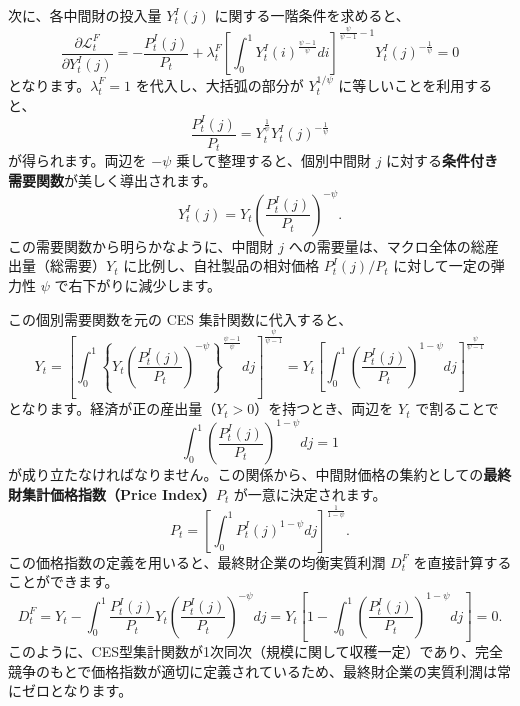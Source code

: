 \documentclass[
  japanese,
  lualatex,
  ja=standard,
  12pt,
  a4paper]{ltjsarticle}
\begin{document}
次に、各中間財の投入量 \(Y_t^I(j)\) に関する一階条件を求めると、 \[
\frac{\partial \mathcal{L}_t^F}{\partial Y_t^I(j)} = -\frac{P_t^I(j)}{P_t} + \lambda_t^F \left[ \int_0^1 Y_t^I(i)^{\frac{\psi-1}{\psi}} di \right]^{\frac{\psi}{\psi-1} - 1} Y_t^I(j)^{-\frac{1}{\psi}} = 0
\] となります。\(\lambda_t^F = 1\) を代入し、大括弧の部分が
\(Y_t^{1/\psi}\) に等しいことを利用すると、 \[
\frac{P_t^I(j)}{P_t} = Y_t^{\frac{1}{\psi}} Y_t^I(j)^{-\frac{1}{\psi}}
\] が得られます。両辺を \(-\psi\) 乗して整理すると、個別中間財 \(j\)
に対する\textbf{条件付き需要関数}が美しく導出されます。 \[
Y_t^I(j) = Y_t \left( \frac{P_t^I(j)}{P_t} \right)^{-\psi}.
\] この需要関数から明らかなように、中間財 \(j\)
への需要量は、マクロ全体の総産出量（総需要）\(Y_t\)
に比例し、自社製品の相対価格 \(P_t^I(j)/P_t\) に対して一定の弾力性
\(\psi\) で右下がりに減少します。

この個別需要関数を元の CES 集計関数に代入すると、 \[
Y_t = \left[ \int_0^1 \left\{ Y_t \left( \frac{P_t^I(j)}{P_t} \right)^{-\psi} \right\}^{\frac{\psi-1}{\psi}} dj \right]^{\frac{\psi}{\psi-1}} = Y_t \left[ \int_0^1 \left( \frac{P_t^I(j)}{P_t} \right)^{1-\psi} dj \right]^{\frac{\psi}{\psi-1}}
\] となります。経済が正の産出量（\(Y_t > 0\)）を持つとき、両辺を \(Y_t\)
で割ることで \[
\int_0^1 \left( \frac{P_t^I(j)}{P_t} \right)^{1-\psi} dj = 1
\]
が成り立たなければなりません。この関係から、中間財価格の集約としての\textbf{最終財集計価格指数（Price
Index）\(P_t\)} が一意に決定されます。 \[
P_t = \left[ \int_0^1 P_t^I(j)^{1-\psi} dj \right]^{\frac{1}{1-\psi}}.
\] この価格指数の定義を用いると、最終財企業の均衡実質利潤 \(D_t^F\)
を直接計算することができます。 \[
D_t^F = Y_t - \int_0^1 \frac{P_t^I(j)}{P_t} Y_t \left( \frac{P_t^I(j)}{P_t} \right)^{-\psi} dj = Y_t \left[ 1 - \int_0^1 \left( \frac{P_t^I(j)}{P_t} \right)^{1-\psi} dj \right] = 0.
\]
このように、CES型集計関数が1次同次（規模に関して収穫一定）であり、完全競争のもとで価格指数が適切に定義されているため、最終財企業の実質利潤は常にゼロとなります。
\end{document}

